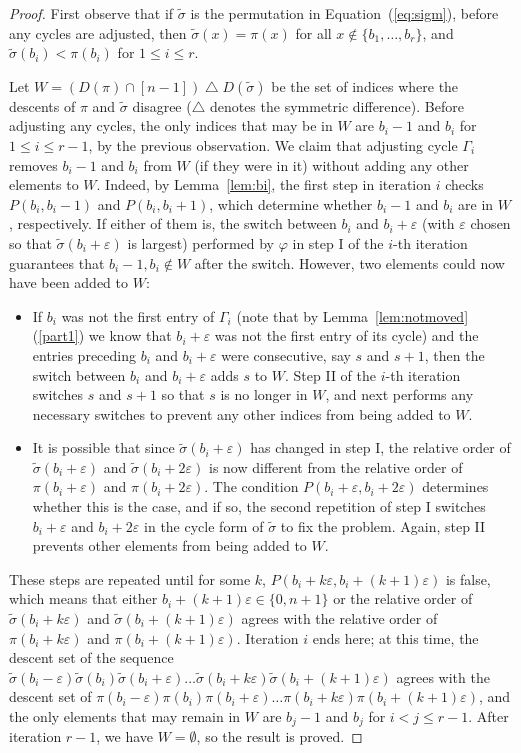 \documentclass[11pt]{amsart}
\newcommand\bit{\begin{itemize}}
\newcommand\eit{\end{itemize}}
\newcommand\wt{\widetilde}
\newcommand\bij{\varphi}
\newcommand\eps{\varepsilon}
\newcommand\sigm{\wt\sigma}
\begin{document}
\begin{proof}
First observe that if $\sigm$ is the permutation in Equation~(\ref{eq:sigm}), before any cycles are adjusted, then $\sigm(x)=\pi(x)$ for all $x\notin\{b_1,\dots,b_r\}$, and $\sigm(b_i)<\pi(b_i)$ for $1\le i\le r$.

Let $W=(D(\pi)\cap[n-1])\bigtriangleup D(\sigm)$
be the set of indices where the descents of $\pi$ and $\sigm$ disagree ($\bigtriangleup$ denotes the symmetric difference). Before adjusting any cycles, the only indices that may be in $W$
are $b_i-1$ and $b_i$ for $1\le i\le r-1$, by the previous observation.
We claim that adjusting cycle $\Gamma_i$ removes $b_i-1$ and $b_i$ from $W$ (if they were in it) without adding any other elements to $W$.
Indeed, by Lemma~\ref{lem:bi}, the first step in iteration $i$ checks $P(b_i,b_i-1)$ and $P(b_i,b_i+1)$, which determine whether $b_i-1$ and $b_i$ are in $W$, respectively. If either of them is, the
switch between $b_i$ and $b_i+\eps$ (with $\eps$ chosen so that $\sigm(b_i+\eps)$ is largest) performed by $\bij$ in step I of the $i$-th iteration guarantees that $b_i-1,b_i\notin W$ after the switch.
However, two elements could now have been added to $W$:\bit
\item If $b_i$ was not the first entry of $\Gamma_i$ (note that by Lemma~\ref{lem:notmoved}(\ref{part1}) we know that $b_i+\eps$ was not the first entry of its cycle)
and the entries preceding $b_i$ and $b_i+\eps$ were consecutive, say $s$ and $s+1$,
then the switch between $b_i$ and $b_i+\eps$ adds $s$ to $W$. Step II of the $i$-th iteration switches $s$ and $s+1$ so that $s$ is no longer in $W$, and next
performs any necessary switches to prevent any other indices from being added to $W$.
\item It is possible that since $\sigm(b_i+\eps)$ has changed in step I, the relative order of $\sigm(b_i+\eps)$ and $\sigm(b_i+2\eps)$ is now different from the relative order of $\pi(b_i+\eps)$ and $\pi(b_i+2\eps)$.
The condition $P(b_i+\eps,b_i+2\eps)$ determines whether this is the case, and if so, the second repetition of step I
switches $b_i+\eps$ and $b_i+2\eps$ in the cycle form of $\sigm$ to fix the problem. Again, step II prevents other elements from being added to $W$.
\eit
These steps are repeated until for some $k$, $P(b_i+k\eps,b_i+(k{+}1)\eps)$ is false, which means that either $b_i+(k{+}1)\eps\in\{0,n+1\}$
or the relative order of $\sigm(b_i+k\eps)$ and $\sigm(b_i+(k{+}1)\eps)$ agrees with the relative order of $\pi(b_i+k\eps)$ and $\pi(b_i+(k{+}1)\eps)$.
Iteration $i$ ends here; at this time, the descent set of the sequence
$\sigm(b_i-\eps)\sigm(b_i)\sigm(b_i+\eps)\dots\sigm(b_i+k\eps)\sigm(b_i+(k{+}1)\eps)$ agrees with the descent set of
$\pi(b_i-\eps)\pi(b_i)\pi(b_i+\eps)\dots\pi(b_i+k\eps)\pi(b_i+(k{+}1)\eps)$, and the only elements that may remain in $W$ are $b_j-1$ and $b_j$ for $i< j\le r-1$.
After iteration $r-1$, we have $W=\emptyset$, so the result is proved.
\end{proof}
\end{document}
